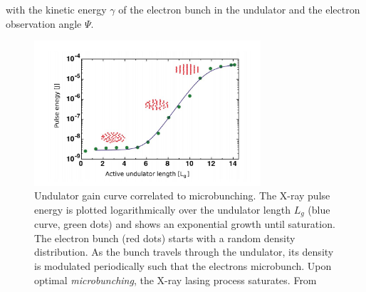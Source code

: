 with the kinetic energy $\gamma$ of the electron bunch in the undulator and the electron observation angle $\Psi$.\\
\begin{figure}
	\centering
		\includegraphics[width=0.75\textwidth]{images/gain-length.JPG}
	\caption[Undulator gain curve correlated to microbunching.]{Undulator gain curve correlated to microbunching. The X-ray pulse energy is plotted logarithmically over the undulator length $L_{g}$ (blue curve, green dots) and shows an exponential growth until saturation. The electron bunch (red dots) starts with a random density distribution. As the bunch travels through the undulator, its density is modulated periodically such that the electrons microbunch. Upon optimal \textit{microbunching}, the X-ray lasing process saturates. From \citep{Rupp-2013-Thesis,Rupp-2016-Springer}}
	\label{fig:gain-length}
\end{figure}
